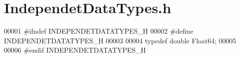 \hypertarget{_independet_data_types_8h_source}{}\section{Independet\+Data\+Types.\+h}
\label{_independet_data_types_8h_source}

\begin{DoxyCode}
00001 \textcolor{preprocessor}{#ifndef INDEPENDETDATATYPES\_H}
00002 \textcolor{preprocessor}{#define INDEPENDETDATATYPES\_H}
00003 
00004 \textcolor{keyword}{typedef} \textcolor{keywordtype}{double} Float64;
00005 
00006 \textcolor{preprocessor}{#endif  INDEPENDETDATATYPES\_H}
\end{DoxyCode}
